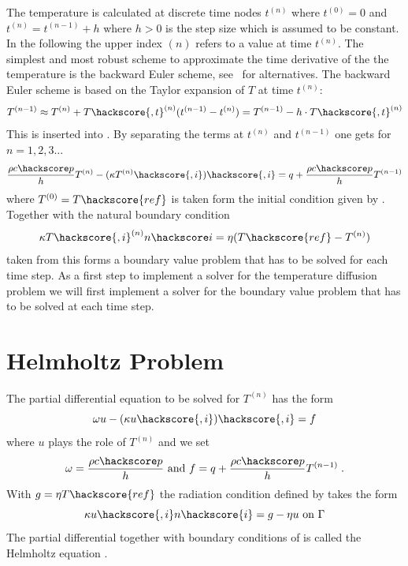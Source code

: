 The temperature is calculated at discrete time nodes $t^{(n)}$ where 
$t^{(0)}=0$ and  $t^{(n)}=t^{(n-1)}+h$ where $h>0$ is the step size which is assumed to be constant. 
In the following the upper index ${(n)}$ refers to a value at time $t^{(n)}$. The simplest
and most robust scheme to approximate the time derivative of the the temperature is 
the backward Euler
 scheme, see~\cite{XXX} for alternatives. The backward Euler 
scheme is based
on the Taylor expansion of $T$ at time $t^{(n)}$:
\begin{equation}
T^{(n-1)}\approx T^{(n)}+T\hackscore{,t}^{(n)}(t^{(n-1)}-t^{(n)})
=T^{(n-1)} - h \cdot T\hackscore{,t}^{(n)}
\label{DIFFUSION TEMP EQ 6}
\end{equation}
This is inserted into . By separating the terms at 
$t^{(n)}$ and  $t^{(n-1)}$ one gets for $n=1,2,3\ldots$
\begin{equation}
\frac{\rho c\hackscore p}{h} T^{(n)} - (\kappa T^{(n)}\hackscore{,i})\hackscore{,i} = q +  \frac{\rho c\hackscore p}{h} T^{(n-1)}
\label{DIFFUSION TEMP EQ 7}
\end{equation}
where $T^{(0)}=T\hackscore{ref}$ is taken form the initial condition given by .
Together with the natural boundary condition 
\begin{equation}
 \kappa T\hackscore{,i}^{(n)} n\hackscore i = \eta (T\hackscore{ref}-T^{(n)}) 
\label{DIFFUSION TEMP EQ 2222}
\end{equation}
taken from 
this forms a boundary value problem that has to be solved for each time step. 
As a first step to implement a solver for the temperature diffusion problem we will 
first implement a solver for the  boundary value problem that has to be solved at each time step.

\section{\label{DIFFUSION HELM SEC}Helmholtz Problem}
The partial differential equation to be solved for $T^{(n)}$ has the form 
\begin{equation}
\omega u  - (\kappa u\hackscore{,i})\hackscore{,i} = f
\label{DIFFUSION HELM EQ 1}
\end{equation}
where $u$ plays the role of $T^{(n)}$ and we set
\begin{equation}
\omega=\frac{\rho c\hackscore p}{h} \mbox{ and } f=q+\frac{\rho c\hackscore p}{h}T^{(n-1)} \;.
\label{DIFFUSION HELM EQ 1b}
\end{equation}
With $g=\eta T\hackscore{ref}$ the radiation condition defined by 
takes the form 
\begin{equation}
\kappa u\hackscore{,i} n\hackscore{i} =  g - \eta u\mbox{ on } \Gamma
\label{DIFFUSION HELM EQ 2}
\end{equation}
The partial differential 
 together with boundary conditions of 
is called the Helmholtz equation . 

